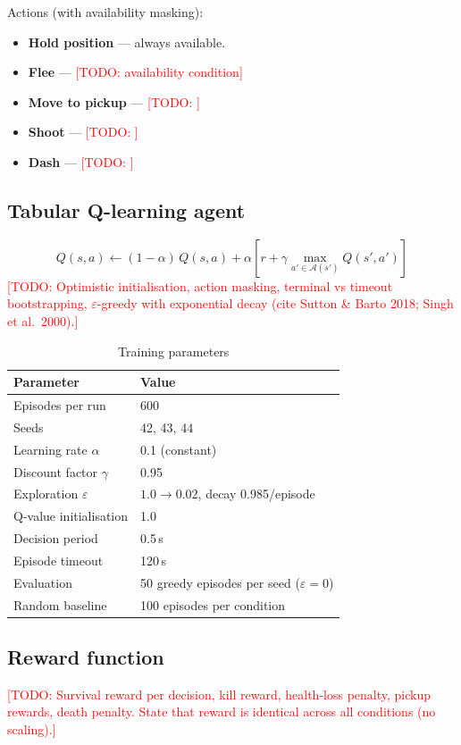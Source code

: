 \documentclass[10pt,a4paper]{article}
\newcommand{\todo}[1]{\textcolor{red}{[TODO: #1]}}
\begin{document}
\noindent Actions (with availability masking):
\begin{itemize}
    \item \textbf{Hold position} --- always available.
    \item \textbf{Flee} --- \todo{availability condition}
    \item \textbf{Move to pickup} --- \todo{}
    \item \textbf{Shoot} --- \todo{}
    \item \textbf{Dash} --- \todo{}
\end{itemize}

\subsection{Tabular Q-learning agent}
\begin{equation}
Q(s,a) \leftarrow (1-\alpha)\,Q(s,a) + \alpha\left[r + \gamma \max_{a' \in \mathcal{A}(s')} Q(s',a')\right]
\end{equation}
\todo{Optimistic initialisation, action masking, terminal vs timeout bootstrapping,
$\varepsilon$-greedy with exponential decay (cite Sutton \& Barto 2018; Singh et al.\ 2000).}

\begin{table}[h]
\centering
\caption{Training parameters}
\label{tab:params}
\begin{tabular}{ll}
\toprule
Parameter & Value \\
\midrule
Episodes per run & 600 \\
Seeds & 42, 43, 44 \\
Learning rate $\alpha$ & 0.1 (constant) \\
Discount factor $\gamma$ & 0.95 \\
Exploration $\varepsilon$ & $1.0 \rightarrow 0.02$, decay 0.985/episode \\
Q-value initialisation & 1.0 \\
Decision period & 0.5\,s \\
Episode timeout & 120\,s \\
Evaluation & 50 greedy episodes per seed ($\varepsilon=0$) \\
Random baseline & 100 episodes per condition \\
\bottomrule
\end{tabular}
\end{table}

\subsection{Reward function}
\todo{Survival reward per decision, kill reward, health-loss penalty, pickup rewards,
death penalty. State that reward is identical across all conditions (no scaling).}
\end{document}
